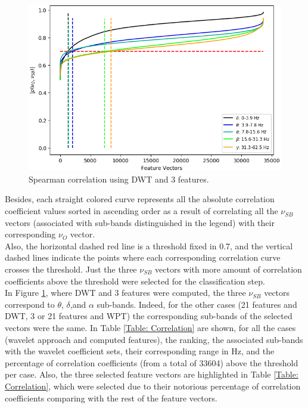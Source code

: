 \begin{figure}[h!]
\centering
\includegraphics[width=\linewidth]{Figures/Correlation.png}
\caption{Spearman correlation using DWT and 3 features.}
\label{Fig: Correlation}
\end{figure}

Besides, each straight colored curve represents all the absolute correlation coefficient values sorted in ascending order as a result of correlating all the $ \nu_{SB} $ vectors (associated with sub-bands distinguished in the legend) with their corresponding \small$ \nu_{O }$ vector.\\

Also, the horizontal dashed red line is a threshold fixed in 0.7, and the vertical dashed lines indicate the points where each corresponding correlation curve crosses the threshold. Just the three $ \nu_{SB} $ vectors with more amount of correlation coefficients above the threshold were selected for the classification step.\\

In Figure \ref{Fig: Correlation}, where DWT and 3 features were computed, the three $ \nu_{SB} $ vectors  correspond to $ \theta $, $ \delta $,and $ \alpha $ sub-bands. Indeed, for the other cases (21 features and DWT, 3 or 21 features and WPT) the corresponding sub-bands of the selected vectors were the same. In Table \ref{Table: Correlation} are shown, for all the cases (wavelet approach and computed features), the ranking, the associated sub-bands with the wavelet coefficient sets, their corresponding range in Hz, and the percentage of correlation coefficients (from a total of 33604) above the threshold per case. Also, the three selected feature vectors are highlighted in Table \ref{Table: Correlation}, which were selected due to their notorious percentage of correlation coefficients comparing with the rest of the feature vectors.\\

